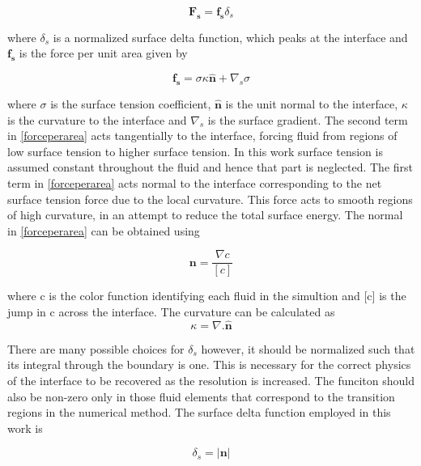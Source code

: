 \begin{equation}
 \mathbf{F_s} = \mathbf{f_s} \delta_s
\end{equation}

\noindent
where $\delta_s$ is a normalized surface delta function, which peaks at the interface and $\mathbf{f_s}$ is the force per unit area given by

\begin{equation}
 \mathbf{f_s} = \sigma \kappa \mathbf{\hat{n}} + \nabla_s \sigma
 \label{forceperarea}
\end{equation}

\noindent
where $\sigma$ is the surface tension coefficient, $\mathbf{\hat{n}}$ is the unit normal to the interface, $\kappa$ is the curvature to the interface and $\nabla_s$ is the surface gradient. The second term in \ref{forceperarea} acts tangentially to the interface, forcing fluid from regions of low surface tension to higher surface tension. In this work surface tension is assumed constant throughout the fluid and hence that part is neglected. The first term in \ref{forceperarea} acts normal to the interface corresponding to the net surface tension force due to the local curvature. This force acts to smooth regions of high curvature, in an attempt to reduce the total surface energy.
The normal in \ref{forceperarea} can be obtained using

\begin{equation}
 \mathbf{n} = \frac{\nabla c}{[c]}
\end{equation}

\noindent
where c is the color function identifying each fluid in the simultion and [c] is the jump in c across the interface. The curvature can be calculated as
\begin{equation}
 \kappa = \nabla . \mathbf{\hat{n}}
\end{equation}

\noindent
There are many possible choices for $\delta_s$ however, it should be normalized such that its integral through the boundary is one. This is necessary for the correct physics of the interface to be recovered as the resolution is increased. The funciton should also be non-zero only in those fluid elements that correspond to the transition regions in the numerical method. The surface delta function employed in this work is

\begin{equation}
 \delta_s = \left| \mathbf{n} \right |
\end{equation}


